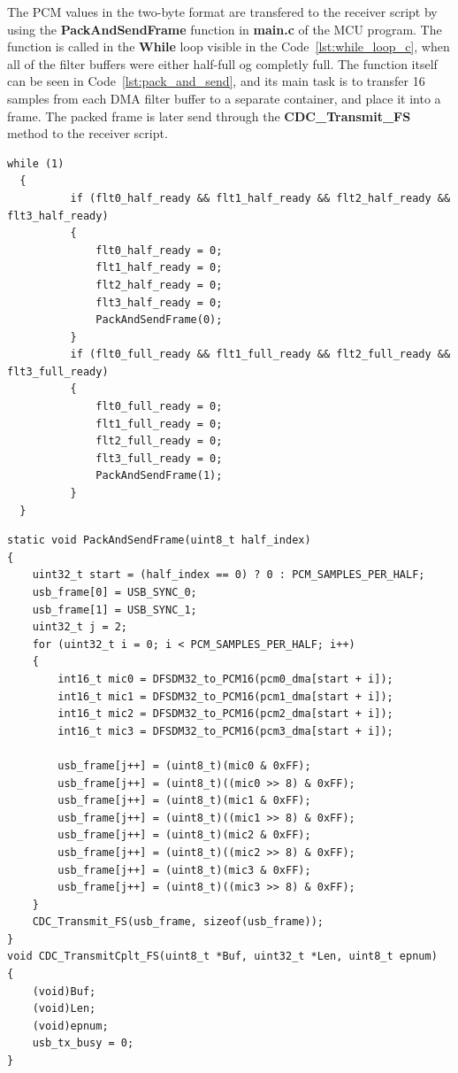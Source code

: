     \newpage
    The PCM values in the two-byte format are transfered to the receiver script by using the \textbf{PackAndSendFrame} function in \textbf{main.c} of the MCU program. The function is called in the \textbf{While} loop visible in the Code~\ref{lst:while_loop_c}, when all of the filter buffers were either half-full og completly full. The function itself can be seen in Code~\ref{lst:pack_and_send}, and its main task is to transfer 16 samples from each DMA filter buffer to a separate container, and place it into a frame. The packed frame is later send through the \textbf{CDC\_Transmit\_FS} method to the receiver script.\\

\begin{lstlisting}[style=cstyle, caption={Main loop for checking DMA buffer readiness and transmitting audio frames}, label={lst:while_loop_c}]
     while (1)
  {
	      if (flt0_half_ready && flt1_half_ready && flt2_half_ready && flt3_half_ready)
	      {
	          flt0_half_ready = 0;
	          flt1_half_ready = 0;
	          flt2_half_ready = 0;
	          flt3_half_ready = 0;
	          PackAndSendFrame(0);
	      }
	      if (flt0_full_ready && flt1_full_ready && flt2_full_ready && flt3_full_ready)
	      {
	    	  flt0_full_ready = 0;
	    	  flt1_full_ready = 0;
	    	  flt2_full_ready = 0;
	    	  flt3_full_ready = 0;
	          PackAndSendFrame(1);
	      }
  }
\end{lstlisting}
    \begin{lstlisting}[style=cstyle, caption={Function for packing and sending each frame, generated by \cite{chatgpt2026}}, label={lst:pack_and_send}]
    static void PackAndSendFrame(uint8_t half_index)
{
    uint32_t start = (half_index == 0) ? 0 : PCM_SAMPLES_PER_HALF;
    usb_frame[0] = USB_SYNC_0;
    usb_frame[1] = USB_SYNC_1;
    uint32_t j = 2;
    for (uint32_t i = 0; i < PCM_SAMPLES_PER_HALF; i++)
    {
        int16_t mic0 = DFSDM32_to_PCM16(pcm0_dma[start + i]);
        int16_t mic1 = DFSDM32_to_PCM16(pcm1_dma[start + i]);
        int16_t mic2 = DFSDM32_to_PCM16(pcm2_dma[start + i]);
        int16_t mic3 = DFSDM32_to_PCM16(pcm3_dma[start + i]);
        
        usb_frame[j++] = (uint8_t)(mic0 & 0xFF);
        usb_frame[j++] = (uint8_t)((mic0 >> 8) & 0xFF);
        usb_frame[j++] = (uint8_t)(mic1 & 0xFF);
        usb_frame[j++] = (uint8_t)((mic1 >> 8) & 0xFF);
        usb_frame[j++] = (uint8_t)(mic2 & 0xFF);
        usb_frame[j++] = (uint8_t)((mic2 >> 8) & 0xFF);
        usb_frame[j++] = (uint8_t)(mic3 & 0xFF);
        usb_frame[j++] = (uint8_t)((mic3 >> 8) & 0xFF);
    }
    CDC_Transmit_FS(usb_frame, sizeof(usb_frame));
}
void CDC_TransmitCplt_FS(uint8_t *Buf, uint32_t *Len, uint8_t epnum)
{
    (void)Buf;
    (void)Len;
    (void)epnum;
    usb_tx_busy = 0;
}
\end{lstlisting}
